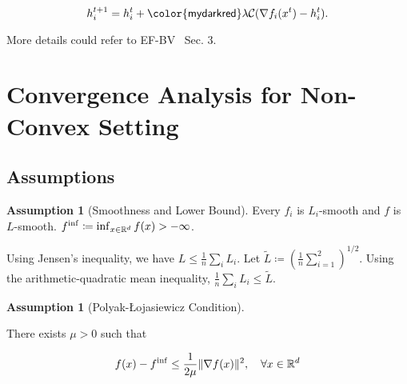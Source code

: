 \documentclass{article} %
\newcommand{\algname}[1]{{\sf\green\relscale{0.90}#1}\xspace}
\newcommand{\sybr}[1]{{\sf\red#1}\xspace}  %
\newcommand{\eqdef}{\coloneqq}
\theoremstyle{plain}
\theoremstyle{definition}
\newtheorem{assumption}[theorem]{Assumption}
\theoremstyle{remark}
\newcommand{\C}{\mathcal{C}}
\newcommand{\green}{\color{mydarkgreen}}
\newcommand{\red}{\color{mydarkred}}
\begin{document}
\begin{equation}
   h_i^{t+1} = h_i^t + \sybr{\lambda} \C(\nabla f_i (x^t) - h_i^t).
\end{equation}

More details could refer to \algname{EF-BV}~\cite{condat2022ef} Sec. 3.

\section{Convergence Analysis for Non-Convex Setting}
\subsection{Assumptions}
\begin{assumption}[Smoothness and Lower Bound]\label{assump:smooth}
   Every $f_i$ is $L_i$-smooth and $f$ is $L$-smooth. $f^{\inf}\eqdef \inf_{x\in \R^d} f(x) > -\infty$.
\end{assumption}

Using Jensen's inequality, we have $L\leq \frac{1}{n}\sum_{i}L_i$. Let $\tilde{L}\eqdef (\frac{1}{n}\sum_{i=1}^2)^{1/2}$. Using the arithmetic-quadratic mean inequality, $\frac{1}{n}\sum_{i}L_i \leq \tilde{L}$.

\begin{assumption}[Polyak-Łojasiewicz Condition]\label{assump:pl}
   
   There exists $\mu>0$ such that 

   \begin{equation}
      f(x) - f^{\inf} \leq \frac{1}{2\mu} \| \nabla f(x)\|^2, \quad \forall x\in\mathbb{R}^d
   \end{equation}
\end{assumption}
\end{document}
